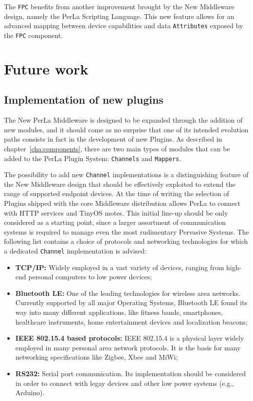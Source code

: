The \texttt{FPC} benefits from another improvement brought by the New
Middleware design, namely the PerLa Scripting Language. This new feature allows
for an advanced mapping between device capabilities and data
    \texttt{Attributes} exposed by the \texttt{FPC} component.


\section{Future work}

\subsection{Implementation of new plugins}

The New PerLa Middleware is designed to be expanded through the addition of new
modules, and it should come as no surprise that one of its intended evolution
paths consists in fact in the development of new Plugins. As described in
chapter~\ref{cha:components}, there are two main types of modules that can be
added to the PerLa Plugin System: \texttt{Channels} and \texttt{Mappers}.

The possibility to add new \texttt{Channel} implementations is a distinguishing
feature of the New Middleware design that should be effectively exploited to
extend the range of supported endpoint devices. At the time of writing the
selection of Plugins shipped with the core Middleware distribution allows PerLa
to connect with HTTP services and TinyOS motes. This initial line-up should be
only considered as a starting point, since a larger assortment of communication
systems is required to manage even the most rudimentary Pervasive Systems. The
following list contains a choice of protocols and networking technologies for
which a dedicated \texttt{Channel} implementation is advised:

\begin{itemize}

    \item \textbf{TCP/IP:} Widely employed in a vast variety of devices,
    ranging from high-end personal computers to low power devices;

    \item \textbf{Bluetooth LE:} One of the leading technologies for wireless
    area networks. Currently supported by all major Operating Systems,
    Bluetooth LE found its way into many different applications, like fitness
    bands, smartphones, healthcare instruments, home entertainment devices and
    localization beacons;

    \item \textbf{IEEE 802.15.4 based protocols:} IEEE 802.15.4 is a physical
    layer widely employed in many personal area network protocols. It is the
    basis for many networking specifications like Zigbee, Xbee and MiWi;

    \item \textbf{RS232:} Serial port communication. Its implementation should
    be considered in order to connect with legay devices and other low power
    systems (e.g., Arduino).

\end{itemize}

